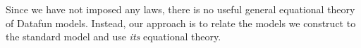 \documentclass[nomarginums]{rntz}\usepackage[tablet]{fantasy}%
\begin{document}
Since we have not imposed any laws, there is no useful general equational theory
of Datafun models. Instead, our approach is to relate the models we construct to
the standard model and use \emph{its} equational theory.






\end{document}
